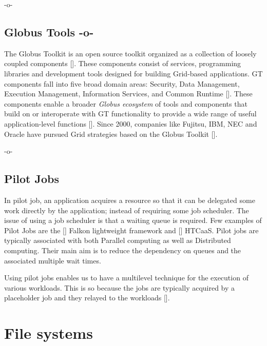 -o- 

\subsection{Globus Tools -o-}

The Globus Toolkit is an open source toolkit organized as a collection
of loosely coupled components [\cite{sotomayor2006globus}]. These
components consist of services, programming libraries and development
tools designed for building Grid-based applications. GT components
fall into five broad domain areas: Security, Data Management,
Execution Management, Information Services, and Common
Runtime [\cite{foster2006globus}]. These components enable a broader
\textit{Globus ecosystem} of tools and components that build on or
interoperate with GT functionality to provide a wide range of useful
application-level functions [\cite{www-about-globus}]. Since 2000,
companies like Fujitsu, IBM, NEC and Oracle have pursued Grid
strategies based on the Globus Toolkit [\cite{www-about-globus}].

     -o-

\subsection{Pilot Jobs}

In pilot job, an application acquires a resource so that it can be
delegated some work directly by the application; instead of requiring
some job scheduler. The issue of using a job scheduler is that a
waiting queue is required. Few examples of Pilot Jobs are
the [\cite{pilot-job-falkon-paper-2007}] Falkon lightweight framework
and [\cite{pilot-job-htcaas-paper-2007}] HTCaaS. Pilot jobs are
typically associated with both Parallel computing as well as
Distributed computing. Their main aim is to reduce the dependency on
queues and the associated multiple wait times.

Using pilot jobs enables us to have a multilevel technique for the
execution of various workloads. This is so because the jobs are
typically acquired by a placeholder job and they relayed to the
workloads [\cite{www-pilot-job-paper-2016}].

\section{File systems}
\label{S:o-file-systems}


